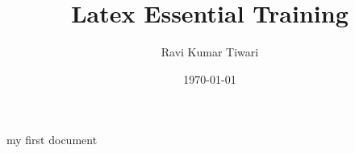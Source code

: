\documentclass{article}
\begin{document}
\title{Latex Essential Training}
\author{Ravi Kumar Tiwari}
\date{\today}
\maketitle

my first document
\end{document}

